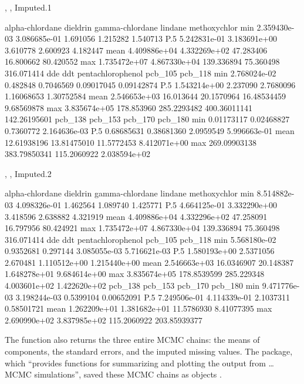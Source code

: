 \begin{Schunk}
\begin{Soutput}
, , Imputed.1

     alpha-chlordane     dieldrin gamma-chlordane   lindane methoxychlor
min     2.359430e-03 3.086685e-01        1.691056  1.215282     1.540713
P.5     5.242831e-01 3.183691e+00        3.610778  2.600923     4.182447
mean    4.409886e+04 4.332269e+02       47.283406 16.800662    80.420552
max     1.735472e+07 4.867330e+04      139.336894 75.360498   316.071414
              dde        ddt pentachlorophenol      pcb_105      pcb_118
min  2.768024e-02   0.482848         0.7046569   0.09017045   0.09142874
P.5  1.543214e+00   2.237090         2.7680096   1.16068653   1.30752584
mean 2.546653e+03  16.013644        20.1570964  16.48534459   9.68569878
max  3.835674e+05 178.853960       285.2293482 400.36011141 142.26195601
          pcb_138      pcb_153     pcb_170      pcb_180
min    0.01173117   0.02468827   0.7360772 2.164636e-03
P.5    0.68685631   0.38681360   2.0959549 5.996663e-01
mean  12.61938196  13.81475010  11.5772453 8.412071e+00
max  269.09903138 383.79850341 115.2060922 2.038594e+02

, , Imputed.2

     alpha-chlordane     dieldrin gamma-chlordane   lindane methoxychlor
min     8.514882e-03 4.098326e-01        1.462564  1.089740     1.425771
P.5     4.664125e-01 3.332290e+00        3.418596  2.638882     4.321919
mean    4.409886e+04 4.332296e+02       47.258091 16.797956    80.424921
max     1.735472e+07 4.867330e+04      139.336894 75.360498   316.071414
              dde         ddt pentachlorophenol      pcb_105      pcb_118
min  5.568180e-02   0.9352681          0.297144 3.085055e-03 5.716621e-03
P.5  1.580193e+00   2.5371056          2.670481 1.110512e+00 1.215440e+00
mean 2.546663e+03  16.0346907         20.148387 1.648278e+01 9.684614e+00
max  3.835674e+05 178.8539599        285.229348 4.003601e+02 1.422620e+02
          pcb_138      pcb_153     pcb_170      pcb_180
min  9.471776e-03 3.198244e-03   0.5399104   0.00652091
P.5  7.249506e-01 4.114339e-01   2.1037311   0.58501721
mean 1.262209e+01 1.381682e+01  11.5786930   8.41077395
max  2.690990e+02 3.837985e+02 115.2060922 203.85939377
\end{Soutput}
\end{Schunk}

The  function also returns the
three entire MCMC chains: the means of components, the standard errors,
and the imputed missing values. The  package, which
``provides functions for summarizing and plotting the output from
\ldots{} MCMC simulations'', saved these MCMC chains as 
objects \citep{plummerCODAConvergenceDiagnosis2006}.

